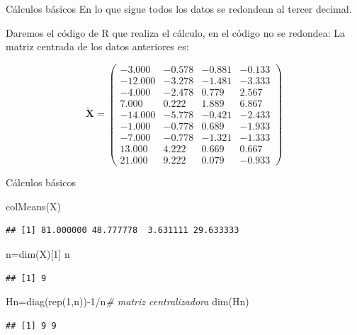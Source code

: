 \documentclass[
  ignorenonframetext,
]{beamer}
\newenvironment{Shaded}{\begin{snugshade}}{\end{snugshade}}
\newcommand{\CommentTok}[1]{\textcolor[rgb]{0.56,0.35,0.01}{\textit{#1}}}
\newcommand{\DecValTok}[1]{\textcolor[rgb]{0.00,0.00,0.81}{#1}}
\newcommand{\FunctionTok}[1]{\textcolor[rgb]{0.00,0.00,0.00}{#1}}
\newcommand{\NormalTok}[1]{#1}
\newcommand{\OtherTok}[1]{\textcolor[rgb]{0.56,0.35,0.01}{#1}}
\newcommand{\SpecialCharTok}[1]{\textcolor[rgb]{0.00,0.00,0.00}{#1}}
\begin{document}
\begin{frame}{Cálculos básicos}
\protect\hypertarget{cuxe1lculos-buxe1sicos}{}
En lo que sigue todos los datos se redondean al tercer decimal.

Daremos el código de R que realiza el cálculo, en el código no se
redondea: La matriz centrada de los datos anteriores es:

\[
\tilde{\mathbf{X}}=
\left(
\begin{array}{rrrr}
-3.000 & -0.578 & -0.881 & -0.133 \\
-12.000 & -3.278 & -1.481 & -3.333 \\
-4.000 & -2.478 & 0.779 & 2.567 \\
7.000 & 0.222 & 1.889 & 6.867 \\
-14.000 & -5.778 & -0.421 & -2.433 \\
-1.000 & -0.778 & 0.689 & -1.933 \\
-7.000 & -0.778 & -1.321 & -1.333 \\
13.000 & 4.222 & 0.669 & 0.667 \\
21.000 & 9.222 & 0.079 & -0.933
\end{array}
\right)
\]
\end{frame}

\begin{frame}[fragile]{Cálculos básicos}
\protect\hypertarget{cuxe1lculos-buxe1sicos-1}{}
\begin{Shaded}
\begin{Highlighting}[]
\FunctionTok{colMeans}\NormalTok{(X)}
\end{Highlighting}
\end{Shaded}

\begin{verbatim}
## [1] 81.000000 48.777778  3.631111 29.633333
\end{verbatim}

\begin{Shaded}
\begin{Highlighting}[]
\NormalTok{n}\OtherTok{=}\FunctionTok{dim}\NormalTok{(X)[}\DecValTok{1}\NormalTok{]}
\NormalTok{n}
\end{Highlighting}
\end{Shaded}

\begin{verbatim}
## [1] 9
\end{verbatim}

\begin{Shaded}
\begin{Highlighting}[]
\NormalTok{Hn}\OtherTok{=}\FunctionTok{diag}\NormalTok{(}\FunctionTok{rep}\NormalTok{(}\DecValTok{1}\NormalTok{,n))}\SpecialCharTok{{-}}\DecValTok{1}\SpecialCharTok{/}\NormalTok{n}\CommentTok{\# matriz centralizadora}
\FunctionTok{dim}\NormalTok{(Hn)}
\end{Highlighting}
\end{Shaded}

\begin{verbatim}
## [1] 9 9
\end{verbatim}
\end{frame}
\end{document}
